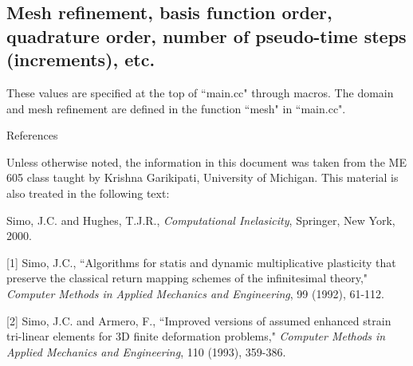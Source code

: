 \documentclass[10pt]{article}
\begin{document}
\subsection{Mesh refinement, basis function order, quadrature order, number of pseudo-time steps (increments), etc.}
These values are specified at the top of ``main.cc" through macros. The domain and mesh refinement are defined in the function ``mesh" in ``main.cc".


\pagebreak

\centerline{\Large{References}}

Unless otherwise noted, the information in this document was taken from the ME 605 class taught by Krishna Garikipati, University of Michigan. This material is also treated in the following text:

Simo, J.C. and Hughes, T.J.R., \textit{Computational Inelasicity}, Springer, New York, 2000.

[1] Simo, J.C., ``Algorithms for statis and dynamic multiplicative plasticity that preserve the classical return mapping schemes of the infinitesimal theory," \textit{Computer Methods in Applied Mechanics and Engineering}, 99 (1992), 61-112.

[2]  Simo, J.C. and Armero, F., ``Improved versions of assumed enhanced strain tri-linear elements for 3D finite deformation problems,"  \textit{Computer Methods in Applied Mechanics and Engineering}, 110 (1993), 359-386.
\end{document}
